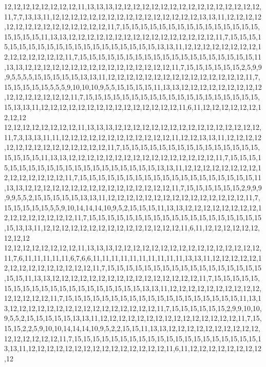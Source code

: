 12,12,12,12,12,12,12,12,11,13,13,13,12,12,12,12,12,12,12,12,12,12,12,12,12,12,12,12,11,7,7,13,13,11,12,12,12,12,12,12,12,12,12,12,12,12,12,12,12,12,13,13,11,12,12,12,12,12,12,12,12,12,12,12,12,12,12,12,11,7,15,15,15,15,15,15,15,15,15,15,15,15,15,15,15,15,15,15,15,11,13,13,12,12,12,12,12,12,12,12,12,12,12,12,12,12,12,12,11,7,15,15,15,15,15,15,15,15,15,15,15,15,15,15,15,15,15,15,15,15,13,13,11,12,12,12,12,12,12,12,12,12,12,12,12,12,12,12,11,7,15,15,15,15,15,15,15,15,15,15,15,15,15,15,15,15,15,15,15,11,13,13,12,12,12,12,12,12,12,12,12,12,12,12,12,12,12,12,11,7,15,15,15,15,15,15,2,5,9,9,9,5,5,5,5,15,15,15,15,15,13,13,11,12,12,12,12,12,12,12,12,12,12,12,12,12,12,12,11,7,15,15,15,15,15,5,5,5,9,10,10,10,9,5,5,15,15,15,15,11,13,13,12,12,12,12,12,12,12,12,12,12,12,12,12,12,12,12,11,7,15,15,15,15,15,15,15,15,15,15,15,15,15,15,15,15,15,15,15,15,13,13,11,12,12,12,12,12,12,12,12,12,12,12,12,12,12,12,11,6,11,12,12,12,12,12,12,12,12,12
12,12,12,12,12,12,12,12,11,13,13,13,12,12,12,12,12,12,12,12,12,12,12,12,12,12,12,12,11,7,3,13,13,11,11,12,12,12,12,12,12,12,12,12,12,12,12,11,12,12,13,13,11,12,12,12,12,12,12,12,12,12,12,12,12,12,12,12,11,7,15,15,15,15,15,15,15,15,15,15,15,15,15,15,15,15,15,15,15,11,13,13,12,12,12,12,12,12,12,12,12,12,12,12,12,12,12,12,11,7,15,15,15,15,15,15,15,15,15,15,15,15,15,15,15,15,15,15,15,15,13,13,11,12,12,12,12,12,12,12,12,12,12,12,12,12,12,12,11,7,15,15,15,15,15,15,15,15,15,15,15,15,15,15,15,15,15,15,15,11,13,13,12,12,12,12,12,12,12,12,12,12,12,12,12,12,12,12,11,7,15,15,15,15,15,15,2,9,9,9,9,9,5,5,2,15,15,15,15,15,13,13,11,12,12,12,12,12,12,12,12,12,12,12,12,12,12,12,11,7,15,15,15,15,15,5,5,9,10,14,14,14,10,9,5,2,15,15,15,11,13,13,12,12,12,12,12,12,12,12,12,12,12,12,12,12,12,12,11,7,15,15,15,15,15,15,15,15,15,15,15,15,15,15,15,15,15,15,15,15,13,13,11,12,12,12,12,12,12,12,12,12,12,12,12,12,12,12,11,6,11,12,12,12,12,12,12,12,12,12
12,12,12,12,12,12,12,12,11,13,13,13,12,12,12,12,12,12,12,12,12,12,12,12,12,12,12,12,11,7,6,11,11,11,11,11,6,7,6,6,11,11,11,11,11,11,11,11,11,11,13,13,11,12,12,12,12,12,12,12,12,12,12,12,12,12,12,12,11,7,15,15,15,15,15,15,15,15,15,15,15,15,15,15,15,15,15,15,15,11,13,13,12,12,12,12,12,12,12,12,12,12,12,12,12,12,12,12,11,7,15,15,15,15,15,15,15,15,15,15,15,15,15,15,15,15,15,15,15,15,13,13,11,12,12,12,12,12,12,12,12,12,12,12,12,12,12,12,11,7,15,15,15,15,15,15,15,15,15,15,15,15,15,15,15,15,15,15,15,11,13,13,12,12,12,12,12,12,12,12,12,12,12,12,12,12,12,12,11,7,15,15,15,15,15,15,2,9,9,10,10,9,5,5,2,15,15,15,15,15,13,13,11,12,12,12,12,12,12,12,12,12,12,12,12,12,12,12,11,7,15,15,15,2,2,5,9,10,10,14,14,14,10,9,5,2,2,15,15,11,13,13,12,12,12,12,12,12,12,12,12,12,12,12,12,12,12,12,11,7,15,15,15,15,15,15,15,15,15,15,15,15,15,15,15,15,15,15,15,15,13,13,11,12,12,12,12,12,12,12,12,12,12,12,12,12,12,12,11,6,11,12,12,12,12,12,12,12,12,12
